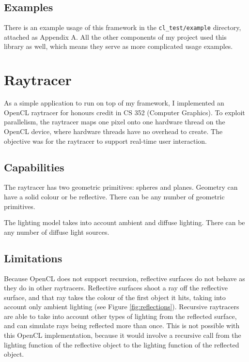 \documentclass{article}
\begin{document}
\subsection{Examples}
There is an example usage of this framework in the \texttt{cl\_test/example} directory, attached as Appendix A. All the other components of my project used this library as well, which means they serve as more complicated usage examples.

\section{Raytracer}
As a simple application to run on top of my framework, I implemented an OpenCL raytracer for honours credit in CS 352 (Computer Graphics). To exploit parallelism, the raytracer maps one pixel onto one hardware thread on the OpenCL device, where hardware threads have no overhead to create. The objective was for the raytracer to support real-time user interaction.

\subsection{Capabilities}
The raytracer has two geometric primitives: spheres and planes. Geometry can have a solid colour or be reflective. There can be any number of geometric primitives.

The lighting model takes into account ambient and diffuse lighting. There can be any number of diffuse light sources.

\subsection{Limitations}
Because OpenCL does not support recursion, reflective surfaces do not behave as they do in other raytracers. Reflective surfaces shoot a ray off the reflective surface, and that ray takes the colour of the first object it hits, taking into account only ambient lighting (see Figure \ref{fig:reflections}). Recursive raytracers are able to take into account other types of lighting from the reflected surface, and can simulate rays being reflected more than once. This is not possible with this OpenCL implementation, because it would involve a recursive call from the lighting function of the reflective object to the lighting function of the reflected object.
\end{document}
